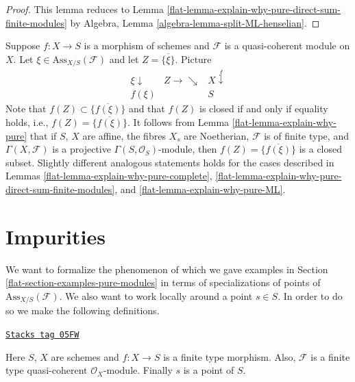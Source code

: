 \begin{proof}

This lemma reduces to
Lemma \ref{flat-lemma-explain-why-pure-direct-sum-finite-modules}
by
Algebra, Lemma \ref{algebra-lemma-split-ML-henselian}.
\end{proof}

Suppose $f : X \to S$ is a morphism of schemes and
$\mathcal{F}$ is a quasi-coherent module on $X$.
Let $\xi \in \text{Ass}_{X/S}(\mathcal{F})$ and let $Z = \overline{\{\xi\}}$.
Picture
$$
\begin{array}{ccc}\xi \downarrow & Z \longrightarrow\searrow & X \overset{f}{\downarrow} \\ f(\xi) &  & S\end{array}
$$
Note that $f(Z) \subset \overline{\{f(\xi)\}}$ and that $f(Z)$ is closed
if and only if equality holds, i.e., $f(Z) = \overline{\{f(\xi)\}}$.
It follows from
Lemma \ref{flat-lemma-explain-why-pure}
that if $S$, $X$ are affine, the fibres $X_s$ are Noetherian,
$\mathcal{F}$ is of finite type, and $\Gamma(X, \mathcal{F})$
is a projective $\Gamma(S, \mathcal{O}_S)$-module, then
$f(Z) = \overline{\{f(\xi)\}}$ is a closed subset.
Slightly different analogous statements holds for the cases described in
Lemmas \ref{flat-lemma-explain-why-pure-complete},
\ref{flat-lemma-explain-why-pure-direct-sum-finite-modules}, and
\ref{flat-lemma-explain-why-pure-ML}.

\section{Impurities}
\label{flat-section-impure}
We want to formalize the phenomenon of which we gave examples in
Section \ref{flat-section-examples-pure-modules}
in terms of specializations of points of $\text{Ass}_{X/S}(\mathcal{F})$.
We also want to work locally around a point $s \in S$. In order to do so we
make the following definitions.

\begin{definition}
\label{flat-situation-pre-pure}
\href{https://stacks.math.columbia.edu/tag/05FW}{\texttt{Stacks tag 05FW}}

Here $S$, $X$ are schemes and $f : X \to S$ is a finite type morphism.
Also, $\mathcal{F}$ is a finite type quasi-coherent $\mathcal{O}_X$-module.
Finally $s$ is a point of $S$.
\end{definition}

